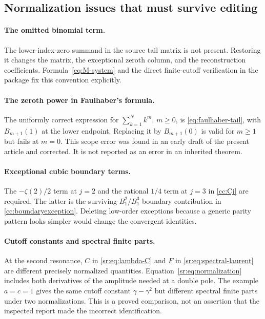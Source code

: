 \documentclass[11pt,letterpaper]{article}
\theoremstyle{definition}
\theoremstyle{remark}
\numberwithin{equation}{section}
\begin{document}
\subsection{Normalization issues that must survive editing}

\paragraph{The omitted binomial term.}
The lower-index-zero summand in the source tail matrix is not present.
Restoring it changes the matrix, the exceptional zeroth column, and the
reconstruction coefficients. Formula~\eqref{eq:M-system} and the direct
finite-cutoff verification in the package fix this convention explicitly.

\paragraph{The zeroth power in Faulhaber's formula.}
The uniformly correct expression for $\sum_{k=1}^N k^m$, $m\ge0$,
is \eqref{eq:faulhaber-tail}, with $B_{m+1}(1)$ at the lower endpoint.
Replacing it by $B_{m+1}(0)$ is valid for $m\ge1$ but fails at $m=0$.
This scope error was found in an early draft of the present article and
corrected. It is not reported as an error in an inherited theorem.

\paragraph{Exceptional cubic boundary terms.}
The $-\zeta(2)/2$ term at $j=2$ and the rational $1/4$ term at $j=3$
in \eqref{cc:Cj} are required. The latter is the surviving
$B_1^2/B_1^3$ boundary contribution in \eqref{cc:boundaryexception}.
Deleting low-order exceptions because a generic parity pattern looks
simpler would change the convergent identities.

\paragraph{Cutoff constants and spectral finite parts.}
At the second resonance, $C$ in \eqref{sr:eq:lambda-C} and $F$ in
\eqref{sr:eq:spectral-laurent} are different precisely normalized
quantities. Equation~\eqref{sr:eq:normalization} includes both derivatives
of the amplitude needed at a double pole. The example $a=c=1$ gives
the same cutoff constant $\gamma-\gamma^2$ but different spectral
finite parts under two normalizations. This is a proved comparison,
not an assertion that the inspected report made the incorrect identification.
\end{document}
